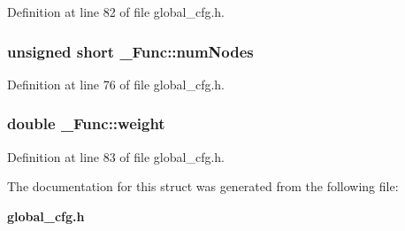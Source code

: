 Definition at line 82 of file global\_\-cfg.h.
\subsubsection{\setlength{\rightskip}{0pt plus 5cm}unsigned short \bf{\_\-Func::num\-Nodes}}\label{struct__Func_b431273d2e3846d525b39d4a249ecf3a}




Definition at line 76 of file global\_\-cfg.h.
\subsubsection{\setlength{\rightskip}{0pt plus 5cm}double \bf{\_\-Func::weight}}\label{struct__Func_0b4febe0d81cc27a84074e6033c026b3}




Definition at line 83 of file global\_\-cfg.h.

The documentation for this struct was generated from the following file:\begin{CompactItemize}
\item 
\bf{global\_\-cfg.h}\end{CompactItemize}
